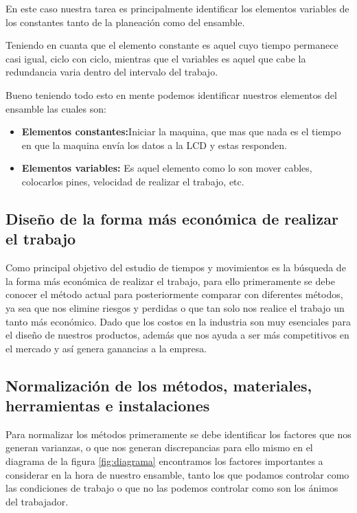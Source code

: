     En este caso nuestra tarea es principalmente identificar los elementos variables de los constantes tanto de la planeación como del ensamble. 
    
    
    Teniendo en cuanta que el elemento constante es aquel cuyo tiempo permanece casi igual, ciclo con ciclo, mientras que el variables es aquel que cabe la redundancia varia dentro del intervalo del trabajo.
    
    Bueno teniendo todo esto en mente podemos identificar nuestros elementos del ensamble las cuales son:
    
    \begin{itemize}
        \item \textbf{Elementos constantes:}Iniciar la maquina, que mas que nada es el tiempo en que la maquina envía los datos a la LCD y estas responden.
        \item \textbf{Elementos variables:} Es aquel elemento como lo son mover cables, colocarlos pines, velocidad de realizar el trabajo, etc.
    \end{itemize}
    
    
    \subsection{Diseño de la forma más económica de realizar el trabajo}
    
    
    Como principal objetivo del estudio de tiempos y movimientos es la búsqueda de la forma más económica de realizar el trabajo, para ello primeramente se debe conocer el método actual para posteriormente comparar con diferentes métodos, ya sea que nos elimine riesgos y perdidas o que tan solo nos realice el trabajo un tanto más económico. Dado que los costos en la industria son muy esenciales para el diseño de nuestros productos, además que nos ayuda a ser más competitivos en el mercado y así genera ganancias a la empresa. 
    \subsection{Normalización de los métodos, materiales, herramientas e instalaciones}
    
    
    Para normalizar los métodos primeramente se debe identificar los factores que nos generan varianzas, o que nos generan discrepancias para ello mismo en el diagrama de la figura \ref{fig:diagrama} encontramos los factores importantes a considerar en la hora de nuestro ensamble, tanto los que podamos controlar como las condiciones de trabajo o que no las podemos controlar como son los ánimos del trabajador.
    
